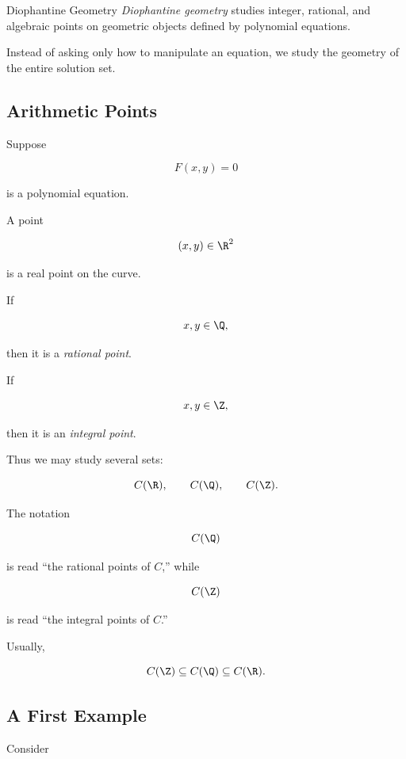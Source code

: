 \begin{definitionbox}{Diophantine Geometry}
\emph{Diophantine geometry} studies integer, rational, and algebraic points
on geometric objects defined by polynomial equations.
\end{definitionbox}

Instead of asking only how to manipulate an equation, we study the geometry
of the entire solution set.

\subsection{Arithmetic Points}
\label{subsec:arithmetic-points}

Suppose

\[ F(x,y)=0 \]

is a polynomial equation.

A point

\[ (x,y)\in\R^2 \]

is a real point on the curve.

If

\[ x,y\in\Q, \]

then it is a \emph{rational point}.

If

\[ x,y\in\Z, \]

then it is an \emph{integral point}.

Thus we may study several sets:

\[
C(\R),\qquad C(\Q),\qquad C(\Z).
\]

The notation

\[ C(\Q) \]

is read ``the rational points of \(C\),'' while

\[ C(\Z) \]

is read ``the integral points of \(C\).''

Usually,

\[ C(\Z)\subseteq C(\Q)\subseteq C(\R). \]

\subsection{A First Example}
\label{subsec:diophantine-geometry-first-example}

Consider

